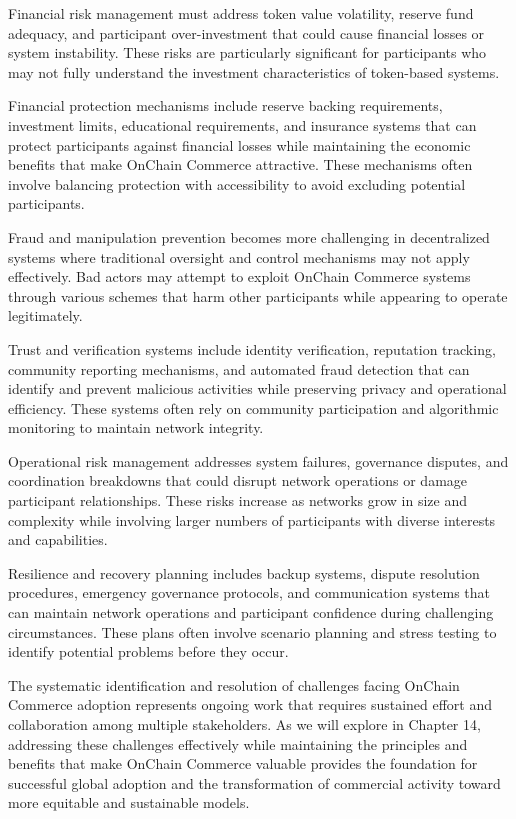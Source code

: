 \documentclass[
  Letterpaper,
]{scrbook}
\begin{document}
Financial risk management must address token value volatility, reserve
fund adequacy, and participant over-investment that could cause
financial losses or system instability. These risks are particularly
significant for participants who may not fully understand the investment
characteristics of token-based systems.

Financial protection mechanisms include reserve backing requirements,
investment limits, educational requirements, and insurance systems that
can protect participants against financial losses while maintaining the
economic benefits that make OnChain Commerce attractive. These
mechanisms often involve balancing protection with accessibility to
avoid excluding potential participants.

Fraud and manipulation prevention becomes more challenging in
decentralized systems where traditional oversight and control mechanisms
may not apply effectively. Bad actors may attempt to exploit OnChain
Commerce systems through various schemes that harm other participants
while appearing to operate legitimately.

Trust and verification systems include identity verification, reputation
tracking, community reporting mechanisms, and automated fraud detection
that can identify and prevent malicious activities while preserving
privacy and operational efficiency. These systems often rely on
community participation and algorithmic monitoring to maintain network
integrity.

Operational risk management addresses system failures, governance
disputes, and coordination breakdowns that could disrupt network
operations or damage participant relationships. These risks increase as
networks grow in size and complexity while involving larger numbers of
participants with diverse interests and capabilities.

Resilience and recovery planning includes backup systems, dispute
resolution procedures, emergency governance protocols, and communication
systems that can maintain network operations and participant confidence
during challenging circumstances. These plans often involve scenario
planning and stress testing to identify potential problems before they
occur.

The systematic identification and resolution of challenges facing
OnChain Commerce adoption represents ongoing work that requires
sustained effort and collaboration among multiple stakeholders. As we
will explore in Chapter 14, addressing these challenges effectively
while maintaining the principles and benefits that make OnChain Commerce
valuable provides the foundation for successful global adoption and the
transformation of commercial activity toward more equitable and
sustainable models.
\end{document}
